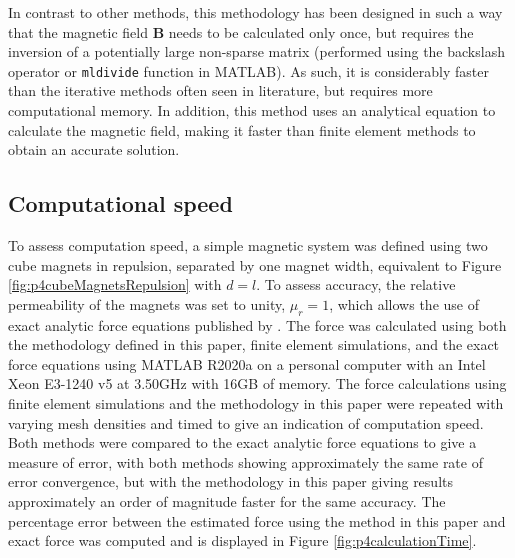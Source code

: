 In contrast to other methods, this methodology has been designed in such a way that the magnetic field \(\mathbf{B}\) needs to be calculated only once, but requires the inversion of a potentially large non-sparse matrix (performed using the backslash operator or \texttt{mldivide} function in MATLAB). As such, it is considerably faster than the iterative methods often seen in literature, but requires more computational memory. In addition, this method uses an analytical equation \cite{OConnell2020a} to calculate the magnetic field, making it faster than finite element methods to obtain an accurate solution.

\subsection{Computational speed}
To assess computation speed, a simple magnetic system was defined using two cube magnets in repulsion, separated by one magnet width, equivalent to Figure \ref{fig:p4cubeMagnetsRepulsion} with \(d = l\). To assess accuracy, the relative permeability of the magnets was set to unity, \(\mu_r = 1\), which allows the use of exact analytic force equations published by \textcite{Akoun1984}. The force was calculated using both the methodology defined in this paper, finite element simulations, and the exact force equations using MATLAB R2020a on a personal computer with an Intel Xeon E3-1240 v5 at 3.50GHz with 16GB of memory. The force calculations using finite element simulations and the methodology in this paper were repeated with varying mesh densities and timed to give an indication of computation speed. Both methods were compared to the exact analytic force equations \cite{Akoun1984} to give a measure of error, with both methods showing approximately the same rate of error convergence, but with the methodology in this paper giving results approximately an order of magnitude faster for the same accuracy. The percentage error between the estimated force using the method in this paper and exact force was computed and is displayed in Figure \ref{fig:p4calculationTime}.

